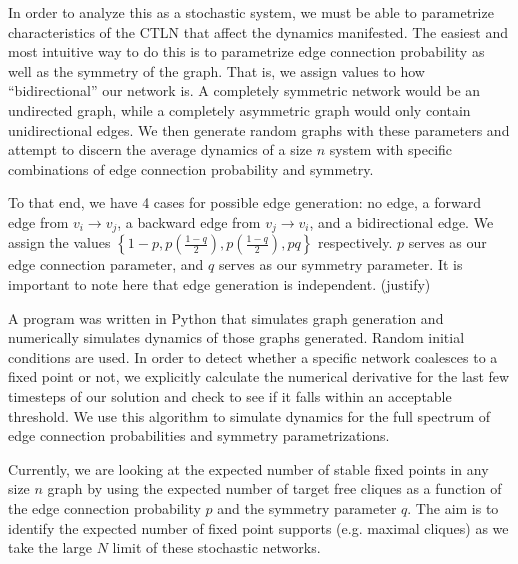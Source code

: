 In order to analyze this as a stochastic system, we must be able to parametrize characteristics of the CTLN that affect the dynamics manifested. The easiest and most intuitive way to do this is to parametrize edge connection probability as well as the symmetry of the graph. That is, we assign values to how ``bidirectional'' our network is. A completely symmetric network would be an undirected graph, while a completely asymmetric graph would only contain unidirectional edges. We then generate random graphs with these parameters and attempt to discern the average dynamics of a size $n$ system with specific combinations of edge connection probability and symmetry.

To that end, we have 4 cases for possible edge generation: no edge, a forward edge from $v_i\to v_j$, a backward edge from $v_j\to v_i$, and a bidirectional edge. We assign the values $\left\{1-p, p \left( \frac{1-q}{2}  \right), p \left( \frac{1-q}{2}  \right), pq \right\}$ respectively. $p$ serves as our edge connection parameter, and $q$ serves as our symmetry parameter. It is important to note here that edge generation is independent. (justify)

A program was written in Python that simulates graph generation and numerically simulates dynamics of those graphs generated. Random initial conditions are used. In order to detect whether a specific network coalesces to a fixed point or not, we explicitly calculate the numerical derivative for the last few timesteps of our solution and check to see if it falls within an acceptable threshold. We use this algorithm to simulate dynamics for the full spectrum of edge connection probabilities and symmetry parametrizations. 

Currently, we are looking at the expected number of stable fixed points in any size $n$ graph by using the expected number of target free cliques as a function of the edge connection probability $p$ and the symmetry parameter $q$. The aim is to identify the expected number of fixed point supports (e.g. maximal cliques) as we take the large $N$ limit of these stochastic networks.